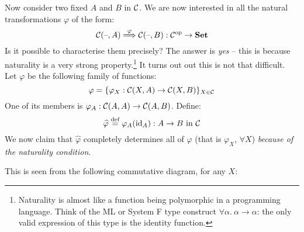 \begin{center}
\end{center}

Now consider two fixed $A$ and $B$ in $\mathcal{C}$. We are now interested in all
the natural transformations $\varphi$ of the form:
\[ \mathcal{C}(\text{--}, A) \overset{\varphi}{\Longrightarrow} \mathcal{C}(\text{--}, B) :
{\mathcal{C}}^{\mathrm{op}} \to \mathbf {Set} \]
Is it possible to characterise them precisely? The answer is \emph{yes} -- this
is because naturality is a very strong property.\footnote{Naturality is almost
like a function being polymorphic in a programming language. Think of the ML
or System F type construct $\forall \alpha.\ \alpha \to \alpha$: the only valid
expression of this type is the identity function.} It turns out out this is not
that difficult. Let $\varphi$ be the following family of functions:
\[ \varphi = \{ \varphi_X: \mathcal{C} (X, A) \to
\mathcal{C} (X, B) \}_{X \in \mathcal{C}} \]
One of its members is $\varphi_A: \mathcal{C} (A, A) \to \mathcal{C} (A, B)$. Define:
\[ \widehat{\varphi} \stackrel{\text{def}}{=} \varphi_A (\mathrm{id}_{ A }) : A \to B \text{ in } \mathcal{C} \]
We now claim that $\widehat{\varphi}$ completely determines all of $\varphi$
(that is $\varphi_X$, $\forall X$) \emph{because of the naturality condition}.

This is seen from the following commutative diagram, for any $X$:

\begin{center}
\end{center}


